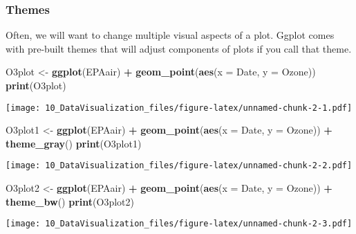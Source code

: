 \documentclass[]{article}
\newenvironment{Shaded}{\begin{snugshade}}{\end{snugshade}}
\newcommand{\KeywordTok}[1]{\textcolor[rgb]{0.13,0.29,0.53}{\textbf{#1}}}
\newcommand{\DataTypeTok}[1]{\textcolor[rgb]{0.13,0.29,0.53}{#1}}
\newcommand{\StringTok}[1]{\textcolor[rgb]{0.31,0.60,0.02}{#1}}
\newcommand{\OperatorTok}[1]{\textcolor[rgb]{0.81,0.36,0.00}{\textbf{#1}}}
\newcommand{\NormalTok}[1]{#1}
\begin{document}
\subsubsection{Themes}\label{themes}

Often, we will want to change multiple visual aspects of a plot. Ggplot
comes with pre-built themes that will adjust components of plots if you
call that theme.

\begin{Shaded}
\begin{Highlighting}[]
\NormalTok{O3plot <-}\StringTok{ }\KeywordTok{ggplot}\NormalTok{(EPAair) }\OperatorTok{+}
\StringTok{  }\KeywordTok{geom_point}\NormalTok{(}\KeywordTok{aes}\NormalTok{(}\DataTypeTok{x =}\NormalTok{ Date, }\DataTypeTok{y =}\NormalTok{ Ozone)) }
\KeywordTok{print}\NormalTok{(O3plot)}
\end{Highlighting}
\end{Shaded}

\texttt{[image: 10\_DataVisualization\_files/figure-latex/unnamed-chunk-2-1.pdf]}

\begin{Shaded}
\begin{Highlighting}[]
\NormalTok{O3plot1 <-}\StringTok{ }\KeywordTok{ggplot}\NormalTok{(EPAair) }\OperatorTok{+}
\StringTok{  }\KeywordTok{geom_point}\NormalTok{(}\KeywordTok{aes}\NormalTok{(}\DataTypeTok{x =}\NormalTok{ Date, }\DataTypeTok{y =}\NormalTok{ Ozone)) }\OperatorTok{+}
\StringTok{  }\KeywordTok{theme_gray}\NormalTok{()}
\KeywordTok{print}\NormalTok{(O3plot1)}
\end{Highlighting}
\end{Shaded}

\texttt{[image: 10\_DataVisualization\_files/figure-latex/unnamed-chunk-2-2.pdf]}

\begin{Shaded}
\begin{Highlighting}[]
\NormalTok{O3plot2 <-}\StringTok{ }\KeywordTok{ggplot}\NormalTok{(EPAair) }\OperatorTok{+}
\StringTok{  }\KeywordTok{geom_point}\NormalTok{(}\KeywordTok{aes}\NormalTok{(}\DataTypeTok{x =}\NormalTok{ Date, }\DataTypeTok{y =}\NormalTok{ Ozone)) }\OperatorTok{+}
\StringTok{  }\KeywordTok{theme_bw}\NormalTok{()}
\KeywordTok{print}\NormalTok{(O3plot2)}
\end{Highlighting}
\end{Shaded}

\texttt{[image: 10\_DataVisualization\_files/figure-latex/unnamed-chunk-2-3.pdf]}
\end{document}
